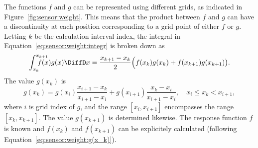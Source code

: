 The functions $f$ and $g$ can be represented using different grids, as
indicated in Figure~\ref{fig:sensor:weight}. This means that the
product between $f$ and $g$ can have a discontinuity at each position
corresponding to a grid point of either $f$ or $g$. Letting $k$ be the
calculation interval index, the integral in
Equation~\ref{eq:sensor:weight:integr} is broken down as
\begin{equation}
  \label{eq:sensor:weight:part integr}
  \int_{x_k}^{x_{k+1}}\hspace{-4ex}f(x)g(x)\DiffD x  = 
    \frac{x_{k+1}-x_k}{2}\Bigl( f(x_k) g(x_k) + 
    f(x_{k+1}) g(x_{k+1}) \bigr).
\end{equation}
The value $g(x_k)$ is 
\begin{equation}
  \label{eq:sensor:weight:g(x_k)} 
  g(x_k) = g(x_i)\frac{x_{i+1}-x_k}{x_{i+1}-x_i} + 
           g(x_{i+1})\frac{x_k-x_i}{x_{i+1}-x_i}, \quad 
           x_i \leq x_k < x_{i+1},
\end{equation}
where $i$ is grid index of $g$, and the range $[x_i,x_{i+1}]$
encompasses the range $[x_k,x_{k+1}]$. The value $g(x_{k+1})$ is
determined likewise. The response function $f$ is
known and $f(x_k)$ and $f(x_{k+1})$ can be explicitely calculated
(following Equation~\ref{eq:sensor:weight:g(x_k)}).
   

